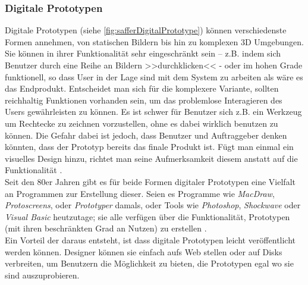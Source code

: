 \subsubsection{Digitale Prototypen} 
Digitale Prototypen (siehe \autoref{fig:safferDigitalPrototype}) können verschiedenste Formen annehmen, von statischen Bildern bis hin zu komplexen 3D Umgebungen. Sie können in ihrer Funktionalität sehr eingeschränkt sein – z.B. indem sich Benutzer durch eine Reihe an Bildern >>durchklicken<< - oder im hohen Grade funktionell, so dass User in der Lage sind mit dem System zu arbeiten als wäre es das Endprodukt. Entscheidet man sich für die komplexere Variante, sollten reichhaltig Funktionen vorhanden sein, um das problemlose Interagieren des Users gewährleisten zu können. Es ist schwer für Benutzer sich z.B. ein Werkzeug um Rechtecke zu zeichnen vorzustellen, ohne es dabei wirklich benutzen zu können. Die Gefahr dabei ist jedoch, dass Benutzer und Auftraggeber denken könnten, dass der Prototyp bereits das finale Produkt ist. Fügt man einmal ein visuelles Design hinzu, richtet man seine Aufmerksamkeit diesem anstatt auf die Funktionalität \citep{Saffer:2007}.\\
Seit den 80er Jahren gibt es für beide Formen digitaler Prototypen eine Vielfalt an Programmen zur Erstellung dieser. Seien es Programme wie \emph{MacDraw}, \emph{Protoscreens}, oder \emph{Prototyper} damals, oder Tools wie \emph{Photoshop}, \emph{Shockwave} oder \emph{Visual Basic} heutzutage; sie alle verfügen über die Funktionalität, Prototypen (mit ihren beschränkten Grad an Nutzen) zu erstellen \citep{Miller-Jacobs:1991}. \\
Ein Vorteil der daraus entsteht, ist dass digitale Prototypen leicht veröffentlicht werden können. Designer können sie einfach aufs Web stellen oder auf Disks verbreiten, um Benutzern die Möglichkeit zu bieten, die Prototypen egal wo sie sind auszuprobieren. 

